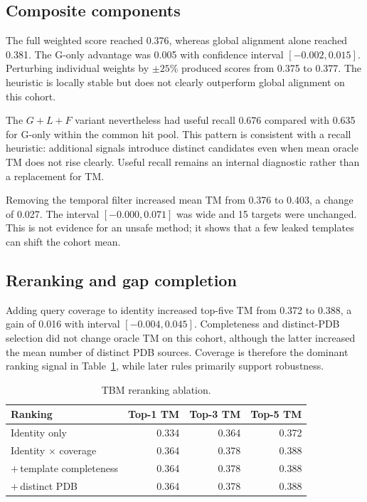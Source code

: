 \documentclass[12pt,a4paper,oneside]{report}
\begin{document}
\subsection{Composite components}

The full weighted score reached 0.376, whereas global alignment alone reached
0.381. The G-only advantage was 0.005 with confidence interval
$[-0.002,0.015]$. Perturbing individual weights by $\pm25\%$ produced scores from
0.375 to 0.377. The heuristic is locally stable but does not clearly outperform
global alignment on this cohort.

The $G+L+F$ variant nevertheless had useful recall 0.676 compared with 0.635 for
G-only within the common hit pool. This pattern is consistent with a recall heuristic:
additional signals introduce distinct candidates even when mean oracle TM does not rise
clearly. Useful recall remains an internal diagnostic rather than a replacement for TM.

Removing the temporal filter increased mean TM from 0.376 to 0.403, a change of
0.027. The interval $[-0.000,0.071]$ was wide and 15 targets were unchanged.
This is not evidence for an unsafe method; it shows that a few leaked templates can shift
the cohort mean.

\subsection{Reranking and gap completion}

Adding query coverage to identity increased top-five TM from 0.372 to 0.388, a
gain of 0.016 with interval $[-0.004,0.045]$. Completeness and distinct-PDB
selection did not change oracle TM on this cohort, although the latter increased the mean
number of distinct PDB sources. Coverage is therefore the dominant ranking signal in
Table~\ref{tab:tbm_rerank_en}, while later rules primarily support robustness.

\begin{table}[H]
\centering
\caption{TBM reranking ablation.}
\label{tab:tbm_rerank_en}
\begin{tabular}{lrrr}
\toprule
Ranking & Top-1 TM & Top-3 TM & Top-5 TM \\
\midrule
Identity only & 0.334 & 0.364 & 0.372 \\
Identity $\times$ coverage & 0.364 & 0.378 & 0.388 \\
$+\,$template completeness & 0.364 & 0.378 & 0.388 \\
$+\,$distinct PDB & 0.364 & 0.378 & 0.388 \\
\bottomrule
\end{tabular}
\end{table}
\end{document}
